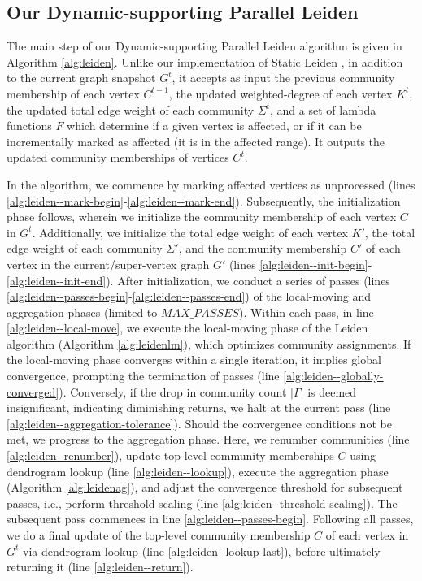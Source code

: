 \subsection{Our Dynamic-supporting Parallel Leiden}
\label{sec:our-leiden}

The main step of our Dynamic-supporting Parallel Leiden algorithm is given in Algorithm \ref{alg:leiden}. Unlike our implementation of Static Leiden \cite{sahu2023gveleiden}, in addition to the current graph snapshot $G^t$, it accepts as input the previous community membership of each vertex $C^{t-1}$, the updated weighted-degree of each vertex $K^t$, the updated total edge weight of each community $\Sigma^t$, and a set of lambda functions $F$ which determine if a given vertex is affected, or if it can be incrementally marked as affected (it is in the affected range). It outputs the updated community memberships of vertices $C^t$.



In the algorithm, we commence by marking affected vertices as unprocessed (lines \ref{alg:leiden--mark-begin}-\ref{alg:leiden--mark-end}). Subsequently, the initialization phase follows, wherein we initialize the community membership of each vertex $C$ in $G^t$. Additionally, we initialize the total edge weight of each vertex $K'$, the total edge weight of each community $\Sigma'$, and the community membership $C'$ of each vertex in the current/super-vertex graph $G'$ (lines \ref{alg:leiden--init-begin}-\ref{alg:leiden--init-end}). After initialization, we conduct a series of passes (lines \ref{alg:leiden--passes-begin}-\ref{alg:leiden--passes-end}) of the local-moving and aggregation phases (limited to $MAX\_PASSES$). Within each pass, in line \ref{alg:leiden--local-move}, we execute the local-moving phase of the Leiden algorithm (Algorithm \ref{alg:leidenlm}), which optimizes community assignments. If the local-moving phase converges within a single iteration, it implies global convergence, prompting the termination of passes (line \ref{alg:leiden--globally-converged}). Conversely, if the drop in community count $|\Gamma|$ is deemed insignificant, indicating diminishing returns, we halt at the current pass (line \ref{alg:leiden--aggregation-tolerance}). Should the convergence conditions not be met, we progress to the aggregation phase. Here, we renumber communities (line \ref{alg:leiden--renumber}), update top-level community memberships $C$ using dendrogram lookup (line \ref{alg:leiden--lookup}), execute the aggregation phase (Algorithm \ref{alg:leidenag}), and adjust the convergence threshold for subsequent passes, i.e., perform threshold scaling (line \ref{alg:leiden--threshold-scaling}). The subsequent pass commences in line \ref{alg:leiden--passes-begin}. Following all passes, we do a final update of the top-level community membership $C$ of each vertex in $G^t$ via dendrogram lookup (line \ref{alg:leiden--lookup-last}), before ultimately returning it (line \ref{alg:leiden--return}).


